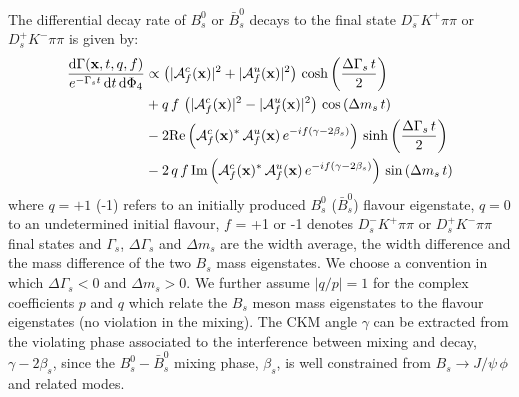 The differential decay rate of $B_s^{0}$ or $\bar B_s^{0}$ decays to the final state $D_s^{-} K^{+} \pi\pi$ or $D_s^{+} K^{-} \pi\pi$
is given by: 
\begin{equation}
\begin{split}
\label{eq:PDF_full}
	\frac{ \text{d}\Gamma(\mathbf{x},t,q,f)}{ e^{- \Gamma_s t} \, \text{d}t \, \text{d}\Phi_4} &\propto  
	 \left( \vert \mathcal A^c_{f}(\mathbf{x}) \vert^2 + \vert \mathcal A^u_{f}(\mathbf{x}) \vert^2 \right) \, \text{cosh} \left( \frac{\Delta \Gamma_s \, t}{2}\right) \\
	 & + q \, f \,  \left( \vert \mathcal A^c_{f}(\mathbf{x}) \vert^2 - \vert \mathcal A^u_{f}(\mathbf{x})  \vert^2 \right) \, \text{cos} \left(\Delta m_s \, t \right)  \\
	 & -2 \text{Re}\left( \mathcal A^c_{f}(\mathbf{x})^{*}  \, \mathcal A^u_{f}(\mathbf{x})  \, e^{-i f (\gamma - 2\beta_s)}  \right) \, \text{sinh} \left( \frac{\Delta \Gamma_s \, t}{2}\right)  \\
	 & -2 \, q \, f \, \text{Im}\left( \mathcal A^c_{f}(\mathbf{x})^{*} \, \mathcal A^u_{f}(\mathbf{x})  \, e^{-i f (\gamma - 2\beta_s)}  \right)\, \text{sin} \left(\Delta m_s \, t \right)  
\end{split}
\end{equation}
where $q = +1$ (-1) refers to an initially produced $B_s^{0}$ ($\bar B_s^{0}$) flavour eigenstate, $q = 0$ to an undetermined initial flavour,
$f$ = +1  or -1 denotes $D_s^{-} K^{+} \pi\pi$ or $D_s^{+} K^{-} \pi\pi$ final states
and $\Gamma_s$, $\Delta \Gamma_s$ and $\Delta m_s$ are 
the width average, the width difference 
and the mass difference of the two $B_s$ 
mass eigenstates.
We choose a convention in which $\Delta\Gamma_s < 0$ and $\Delta m_s > 0$. 
We further assume $\vert q/p \vert = 1$ for the complex coefficients $p$ and $q$ which relate the $B_s$ meson mass eigenstates to the flavour eigenstates (no \CP violation
in the mixing).
The CKM angle $\gamma$ can be extracted from the \CP violating phase associated to the interference between mixing and decay, $\gamma - 2 \beta_s $, 
since the $B_s^{0}-\bar B_s^{0}$ mixing phase, $\beta_s$, is well constrained from $B_s \to J/\psi \, \phi$ and related modes. 

